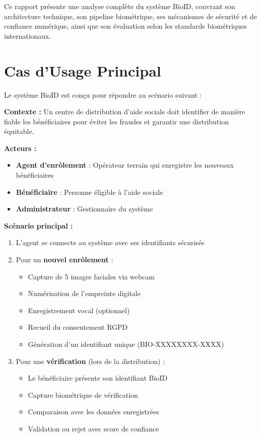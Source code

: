 \documentclass[12pt,a4paper]{report}
\begin{document}
Ce rapport présente une analyse complète du système BioID, couvrant son architecture technique, son pipeline biométrique, ses mécanismes de sécurité et de confiance numérique, ainsi que son évaluation selon les standards biométriques internationaux.

\section*{Cas d'Usage Principal}

Le système BioID est conçu pour répondre au scénario suivant :

\begin{tcolorbox}[colback=bioid-blue!5,colframe=bioid-blue,title=Cas d'Usage : Distribution d'Aide Humanitaire]
\textbf{Contexte :} Un centre de distribution d'aide sociale doit identifier de manière fiable les bénéficiaires pour éviter les fraudes et garantir une distribution équitable.

\textbf{Acteurs :}
\begin{itemize}
    \item \textbf{Agent d'enrôlement} : Opérateur terrain qui enregistre les nouveaux bénéficiaires
    \item \textbf{Bénéficiaire} : Personne éligible à l'aide sociale
    \item \textbf{Administrateur} : Gestionnaire du système
\end{itemize}

\textbf{Scénario principal :}
\begin{enumerate}
    \item L'agent se connecte au système avec ses identifiants sécurisés
    \item Pour un \textbf{nouvel enrôlement} :
    \begin{itemize}
        \item Capture de 5 images faciales via webcam
        \item Numérisation de l'empreinte digitale
        \item Enregistrement vocal (optionnel)
        \item Recueil du consentement RGPD
        \item Génération d'un identifiant unique (BIO-XXXXXXXX-XXXX)
    \end{itemize}
    \item Pour une \textbf{vérification} (lors de la distribution) :
    \begin{itemize}
        \item Le bénéficiaire présente son identifiant BioID
        \item Capture biométrique de vérification
        \item Comparaison avec les données enregistrées
        \item Validation ou rejet avec score de confiance
    \end{itemize}
\end{enumerate}


\end{tcolorbox}
\end{document}
